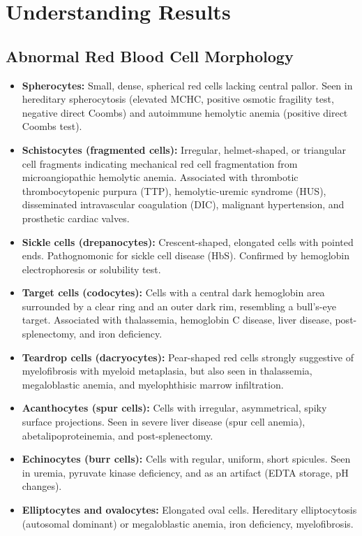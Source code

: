 \section*{Understanding Results}

\subsection*{Abnormal Red Blood Cell Morphology}
\begin{itemize}
  \item \textbf{Spherocytes:} Small, dense, spherical red cells lacking central pallor. Seen in hereditary spherocytosis (elevated MCHC, positive osmotic fragility test, negative direct Coombs) and autoimmune hemolytic anemia (positive direct Coombs test).
  \item \textbf{Schistocytes (fragmented cells):} Irregular, helmet-shaped, or triangular cell fragments indicating mechanical red cell fragmentation from microangiopathic hemolytic anemia. Associated with thrombotic thrombocytopenic purpura (TTP), hemolytic-uremic syndrome (HUS), disseminated intravascular coagulation (DIC), malignant hypertension, and prosthetic cardiac valves.
  \item \textbf{Sickle cells (drepanocytes):} Crescent-shaped, elongated cells with pointed ends. Pathognomonic for sickle cell disease (HbS). Confirmed by hemoglobin electrophoresis or solubility test.
  \item \textbf{Target cells (codocytes):} Cells with a central dark hemoglobin area surrounded by a clear ring and an outer dark rim, resembling a bull's-eye target. Associated with thalassemia, hemoglobin C disease, liver disease, post-splenectomy, and iron deficiency.
  \item \textbf{Teardrop cells (dacryocytes):} Pear-shaped red cells strongly suggestive of myelofibrosis with myeloid metaplasia, but also seen in thalassemia, megaloblastic anemia, and myelophthisic marrow infiltration.
  \item \textbf{Acanthocytes (spur cells):} Cells with irregular, asymmetrical, spiky surface projections. Seen in severe liver disease (spur cell anemia), abetalipoproteinemia, and post-splenectomy.
  \item \textbf{Echinocytes (burr cells):} Cells with regular, uniform, short spicules. Seen in uremia, pyruvate kinase deficiency, and as an artifact (EDTA storage, pH changes).
  \item \textbf{Elliptocytes and ovalocytes:} Elongated oval cells. Hereditary elliptocytosis (autosomal dominant) or megaloblastic anemia, iron deficiency, myelofibrosis.

\end{itemize}
